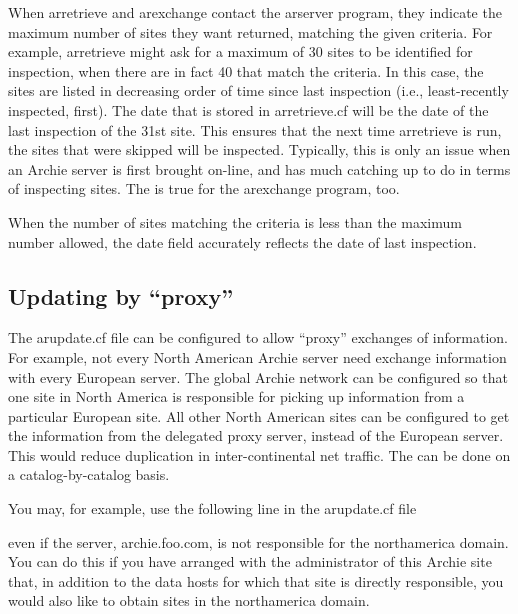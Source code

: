 


When arretrieve and arexchange contact the arserver program, they indicate the
maximum number of sites they want returned, matching the given criteria. For
example, arretrieve might ask for a maximum of 30 sites to be identified for
inspection, when there are in fact 40 that match the criteria. In this case,
the sites are listed in decreasing order of time since last inspection (i.e.,
least-recently inspected, first). The date that is stored in arretrieve.cf
will be the date of the last inspection of the 31st site. This ensures that
the next time arretrieve is run, the sites that were skipped will be
inspected. Typically, this is only an issue when an Archie server is first
brought on-line, and has much catching up to do in terms of inspecting
sites. The is true for the arexchange program, too.

When the number of sites matching the criteria is less than the maximum number
allowed, the date field accurately reflects the date of last inspection. 


\subsection{Updating by ``proxy''}

The arupdate.cf file can be configured to allow ``proxy'' exchanges of information. For example, not every North American Archie server need exchange information with every European server. The global Archie network can be configured so that one site in North America is responsible for picking up information from a particular European site. All other North American sites can be configured to get the information from the delegated proxy server, instead of the European server. This would reduce duplication in inter-continental net traffic. The can be done on a catalog-by-catalog basis.

You may, for example, use the following line in the arupdate.cf file






even if the server, archie.foo.com, is not responsible for the northamerica domain. You can do this if you have arranged with the administrator of this Archie site that, in addition to the data hosts for which that site is directly responsible, you would also like to obtain sites in the northamerica domain.


